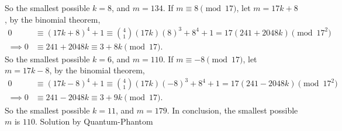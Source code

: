 \documentclass[12pt]{article}
\begin{document}
So the smallest possible \(k=8\), and \(m=134\). If \(m\equiv8\pmod{17}\), let \(m=17k+8\), by the binomial theorem,
\begin{align*}
0&\equiv(17k+8)^4+1\equiv\mathrm {4\choose 1}(17k)(8)^3+8^4+1=17(241+2048k)\pmod{17^2}\\[3pt]
\implies0&\equiv241+2048k\equiv3+8k\pmod{17}.
\end{align*}
So the smallest possible \(k=6\), and \(m=110\). If \(m\equiv-8\pmod{17}\), let \(m=17k-8\), by the binomial theorem,
\begin{align*}
0&\equiv(17k-8)^4+1\equiv\mathrm {4\choose 1}(17k)(-8)^3+8^4+1=17(241-2048k)\pmod{17^2}\\[3pt]
\implies0&\equiv241-2048k\equiv3+9k\pmod{17}.
\end{align*}
So the smallest possible \(k=11\), and \(m=179\). In conclusion, the smallest possible \(m\) is \(\boxed{110}\). Solution by Quantum-Phantom
\end{document}
